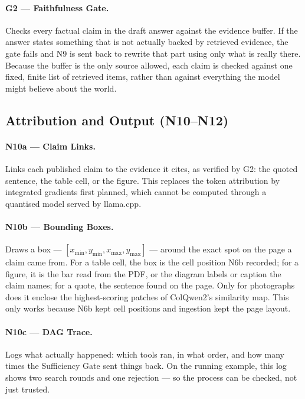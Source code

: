 \paragraph{G2 --- Faithfulness Gate.}
Checks every factual claim in the draft answer against the evidence buffer. If the
answer states something that is not actually backed by retrieved evidence, the
gate fails and N9 is sent back to rewrite that part using only what is really
there. Because the buffer is the only source allowed, each claim is checked
against one fixed, finite list of retrieved items, rather than against everything
the model might believe about the world.

\subsection{Attribution and Output (N10--N12)}

\paragraph{N10a --- Claim Links.}
Links each published claim to the evidence it cites, as verified by G2: the quoted
sentence, the table cell, or the figure. This replaces the token attribution by
integrated gradients first planned, which cannot be computed through a quantised
model served by llama.cpp.

\paragraph{N10b --- Bounding Boxes.}
Draws a box --- $[x_{\min}, y_{\min}, x_{\max}, y_{\max}]$ --- around the exact spot
on the page a claim came from. For a table cell, the box is the cell position N6b
recorded; for a figure, it is the bar read from the PDF, or the diagram labels or
caption the claim names; for a quote, the sentence found on the page. Only for
photographs does it enclose the highest-scoring patches of ColQwen2's similarity map.
This only works because N6b kept cell positions and ingestion kept the page layout.

\paragraph{N10c --- DAG Trace.}
Logs what actually happened: which tools ran, in what order, and how many times the
Sufficiency Gate sent things back. On the running example, this log shows two
search rounds and one rejection --- so the process can be checked, not just
trusted.

